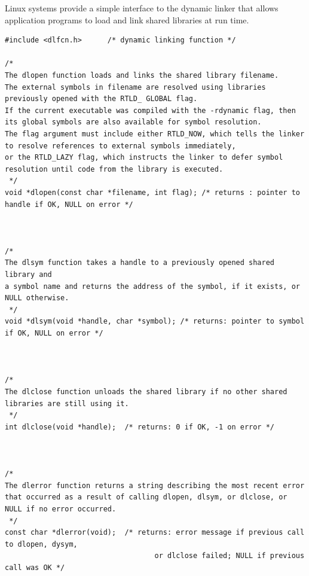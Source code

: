 \documentclass[11pt]{article}
\begin{document}
Linux systems provide a simple interface to the dynamic linker that allows application programs to load and link shared libraries at run time.\\
\begin{verbatim}
#include <dlfcn.h>		/* dynamic linking function */

/* 
The dlopen function loads and links the shared library filename. 
The external symbols in filename are resolved using libraries previously opened with the RTLD_ GLOBAL flag. 
If the current executable was compiled with the -rdynamic flag, then its global symbols are also available for symbol resolution.
The flag argument must include either RTLD_NOW, which tells the linker to resolve references to external symbols immediately, 
or the RTLD_LAZY flag, which instructs the linker to defer symbol resolution until code from the library is executed. 
 */
void *dlopen(const char *filename, int flag); /* returns : pointer to handle if OK, NULL on error */



/* 
The dlsym function takes a handle to a previously opened shared library and 
a symbol name and returns the address of the symbol, if it exists, or NULL otherwise.
 */
void *dlsym(void *handle, char *symbol); /* returns: pointer to symbol if OK, NULL on error */



/* 
The dlclose function unloads the shared library if no other shared libraries are still using it.
 */
int dlclose(void *handle);	/* returns: 0 if OK, -1 on error */



/* 
The dlerror function returns a string describing the most recent error 
that occurred as a result of calling dlopen, dlsym, or dlclose, or NULL if no error occurred.
 */
const char *dlerror(void);	/* returns: error message if previous call to dlopen, dysym,
                                   or dlclose failed; NULL if previous call was OK */

\end{verbatim}
\end{document}

